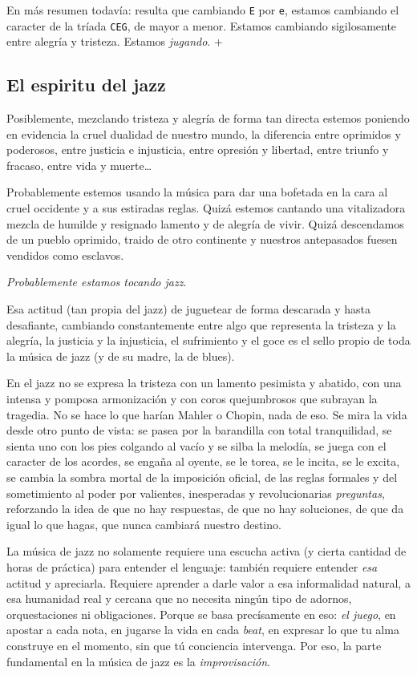 \documentclass[]{article}
\begin{document}
En más resumen todavía: resulta que cambiando \texttt{E} por \texttt{e}, estamos cambiando el caracter de la tríada \texttt{CEG}, de mayor a menor. Estamos cambiando sigilosamente entre alegría y tristeza. Estamos \emph{jugando}. +

\subsection{El espiritu del jazz}

Posiblemente, mezclando tristeza y alegría de forma tan directa estemos poniendo en evidencia la cruel dualidad de nuestro mundo, la diferencia entre oprimidos y poderosos, entre justicia e injusticia, entre opresión y libertad, entre triunfo y fracaso, entre vida y muerte\ldots{}

Probablemente estemos usando la música para dar una bofetada en la cara al cruel occidente y a sus estiradas reglas. Quizá estemos cantando una vitalizadora mezcla de humilde y resignado lamento y de alegría de vivir. Quizá descendamos de un pueblo oprimido, traido de otro continente y nuestros antepasados fuesen vendidos como esclavos.

\emph{Probablemente estamos tocando jazz}.

Esa actitud (tan propia del jazz) de juguetear de forma descarada y hasta desafiante, cambiando constantemente entre algo que representa la tristeza y la alegría, la justicia y la injusticia, el sufrimiento y el goce es el sello propio de toda la música de jazz (y de su madre, la de blues).

En el jazz no se expresa la tristeza con un lamento pesimista y abatido, con una intensa y pomposa armonización y con coros quejumbrosos que subrayan la tragedia. No se hace lo que harían Mahler o Chopin, nada de eso. Se mira la vida desde otro punto de vista: se pasea por la barandilla con total tranquilidad, se sienta uno con los pies colgando al vacío y se silba la melodía, se juega con el caracter de los acordes, se engaña al oyente, se le torea, se le incita, se le excita, se cambia la sombra mortal de la imposición oficial, de las reglas formales y del sometimiento al poder por valientes, inesperadas y revolucionarias \emph{preguntas}, reforzando la idea de que no hay respuestas, de que no hay soluciones, de que da igual lo que hagas, que nunca cambiará nuestro destino.

La música de jazz no solamente requiere una escucha activa (y cierta cantidad de horas de práctica) para entender el lenguaje: también requiere entender \emph{esa} actitud y apreciarla. Requiere aprender a darle valor a esa informalidad natural, a esa humanidad real y cercana que no necesita ningún tipo de adornos, orquestaciones ni obligaciones. Porque se basa precísamente en eso: \emph{el juego}, en apostar a cada nota, en jugarse la vida en cada \emph{beat}, en expresar lo que tu alma construye en el momento, sin que tú conciencia intervenga. Por eso, la parte fundamental en la música de jazz es la \emph{improvisación}.
\end{document}
